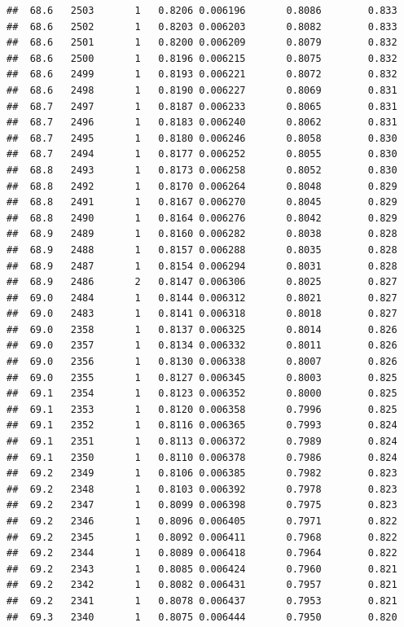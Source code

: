 \documentclass[
]{book}
\begin{document}
\begin{verbatim}
##  68.6   2503       1   0.8206 0.006196       0.8086        0.833
##  68.6   2502       1   0.8203 0.006203       0.8082        0.833
##  68.6   2501       1   0.8200 0.006209       0.8079        0.832
##  68.6   2500       1   0.8196 0.006215       0.8075        0.832
##  68.6   2499       1   0.8193 0.006221       0.8072        0.832
##  68.6   2498       1   0.8190 0.006227       0.8069        0.831
##  68.7   2497       1   0.8187 0.006233       0.8065        0.831
##  68.7   2496       1   0.8183 0.006240       0.8062        0.831
##  68.7   2495       1   0.8180 0.006246       0.8058        0.830
##  68.7   2494       1   0.8177 0.006252       0.8055        0.830
##  68.8   2493       1   0.8173 0.006258       0.8052        0.830
##  68.8   2492       1   0.8170 0.006264       0.8048        0.829
##  68.8   2491       1   0.8167 0.006270       0.8045        0.829
##  68.8   2490       1   0.8164 0.006276       0.8042        0.829
##  68.9   2489       1   0.8160 0.006282       0.8038        0.828
##  68.9   2488       1   0.8157 0.006288       0.8035        0.828
##  68.9   2487       1   0.8154 0.006294       0.8031        0.828
##  68.9   2486       2   0.8147 0.006306       0.8025        0.827
##  69.0   2484       1   0.8144 0.006312       0.8021        0.827
##  69.0   2483       1   0.8141 0.006318       0.8018        0.827
##  69.0   2358       1   0.8137 0.006325       0.8014        0.826
##  69.0   2357       1   0.8134 0.006332       0.8011        0.826
##  69.0   2356       1   0.8130 0.006338       0.8007        0.826
##  69.0   2355       1   0.8127 0.006345       0.8003        0.825
##  69.1   2354       1   0.8123 0.006352       0.8000        0.825
##  69.1   2353       1   0.8120 0.006358       0.7996        0.825
##  69.1   2352       1   0.8116 0.006365       0.7993        0.824
##  69.1   2351       1   0.8113 0.006372       0.7989        0.824
##  69.1   2350       1   0.8110 0.006378       0.7986        0.824
##  69.2   2349       1   0.8106 0.006385       0.7982        0.823
##  69.2   2348       1   0.8103 0.006392       0.7978        0.823
##  69.2   2347       1   0.8099 0.006398       0.7975        0.823
##  69.2   2346       1   0.8096 0.006405       0.7971        0.822
##  69.2   2345       1   0.8092 0.006411       0.7968        0.822
##  69.2   2344       1   0.8089 0.006418       0.7964        0.822
##  69.2   2343       1   0.8085 0.006424       0.7960        0.821
##  69.2   2342       1   0.8082 0.006431       0.7957        0.821
##  69.2   2341       1   0.8078 0.006437       0.7953        0.821
##  69.3   2340       1   0.8075 0.006444       0.7950        0.820

\end{verbatim}
\end{document}
